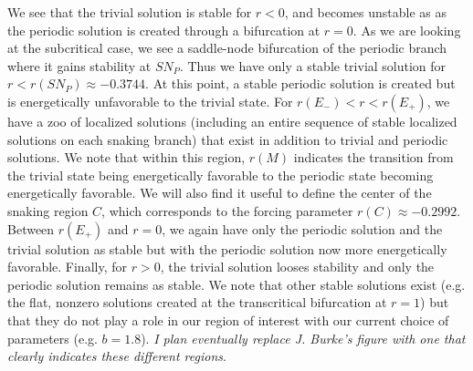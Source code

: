 \documentclass[pre,preprint,superscriptaddress]{revtex4-1}
\begin{document}
We see that the trivial solution is stable for $r<0$, and becomes unstable as as the periodic solution is created through a bifurcation at $r=0$.  As we are looking at the subcritical case, we see a saddle-node bifurcation of the periodic branch where it gains stability at $SN_P$.  Thus we have only a stable trivial solution for $r<r(SN_P)\approx -0.3744$. At this point, a stable periodic solution is created but is energetically unfavorable to the trivial state.  For $r(E_-)<r<r(E_+)$, we have a zoo of localized solutions (including an entire sequence of stable localized solutions on each snaking branch) that exist in addition to trivial and periodic solutions.  We note that within this region, $r(M)$ indicates the transition from the trivial state being energetically favorable to the periodic state becoming energetically favorable.  We will also find it useful to define the center of the snaking region $C$, which corresponds to  the forcing parameter $r(C)\approx -0.2992$.  Between $r(E_+)$ and $r=0$, we again have only the periodic solution and the trivial solution as stable but with the periodic solution now more energetically favorable.   Finally, for $r>0$, the trivial solution looses stability and only the periodic solution remains as stable.  We note that other stable solutions exist (e.g. the flat, nonzero solutions created at the transcritical bifurcation at $r=1$) but that they do not play a role in our region of interest with our current choice of parameters (e.g. $b=1.8$).  {\it I plan eventually replace J. Burke's figure with one that clearly indicates these different regions}.
\end{document}
